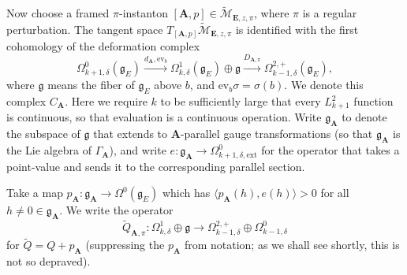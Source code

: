 \documentclass{memo-l}
\theoremstyle{definition}
\theoremstyle{remark}
\numberwithin{section}{chapter}
\numberwithin{equation}{chapter}
\begin{document}
Now choose a framed $\pi$-instanton $[\mathbf{A}, p] \in \widetilde{\mathcal M}_{\mathbf{E},z,\pi}$, where $\pi$ is a regular perturbation. The tangent space $T_{[\mathbf{A}, p]} \widetilde{\mathcal M}_{\mathbf{E},z,\pi}$ is identified with the first cohomology of the deformation complex $$\Omega^0_{k+1,\delta}(\mathfrak g_E) \xrightarrow{d_\mathbf{A}, \text{ev}_b} \Omega^1_{k,\delta}(\mathfrak g_E) \oplus \mathfrak g \xrightarrow{D_{\mathbf{A},\pi}} \Omega^{2,+}_{k-1,\delta}(\mathfrak g_E),$$ where $\mathfrak g$ means the fiber of $\mathfrak g_E$ above $b$, and $\text{ev}_b \sigma = \sigma(b)$. We denote this complex $C_{\mathbf{A}}$. Here we require $k$ to be sufficiently large that every $L^2_{k+1}$ function is continuous, so that evaluation is a continuous operation. Write $\mathfrak g_{\mathbf{A}}$ to denote the subspace of $\mathfrak g$ that extends to $\mathbf{A}$-parallel gauge transformations (so that $\mathfrak g_{\mathbf{A}}$ is the Lie algebra of $\Gamma_{\mathbf{A}}$), and write $e: \mathfrak g_{\mathbf{A}} \to \Omega^0_{k+1,\delta,\text{ext}}$ for the operator that takes a point-value and sends it to the corresponding parallel section.

Take a map $p_{\mathbf{A}}: \mathfrak g_{\mathbf{A}} \to \Omega^0(\mathfrak g_E)$ which has $\langle p_{\mathbf{A}}(h), e(h) \rangle > 0$ for all $h \neq 0 \in \mathfrak g_{\mathbf{A}}$. We write the operator $$\widetilde Q_{\mathbf{A},\pi}: \Omega^1_{k,\delta} \oplus \mathfrak g \to \Omega^{2,+}_{k-1,\delta} \oplus \Omega^0_{k-1,\delta}$$ for $\widetilde Q = Q + p_{\mathbf{A}}$ (suppressing the $p_{\mathbf{A}}$ from notation; as we shall see shortly, this is not so depraved).
\end{document}
